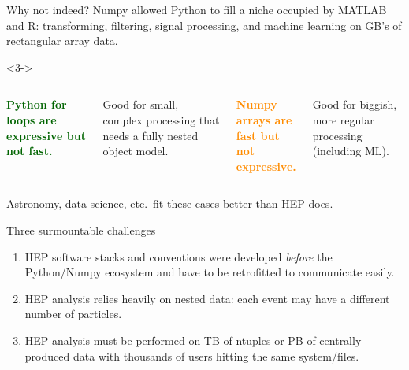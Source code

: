 \documentclass[aspectratio=169]{beamer}
\begin{document}
\begin{frame}{Why not indeed?}
\vspace{0.5 cm}
Numpy allowed Python to fill a niche occupied by MATLAB and R: transforming, filtering, signal processing, and machine learning on GB's of rectangular array data.

\vspace{0.5 cm}

\vspace{0.75 cm}
\begin{uncoverenv}<3->
\begin{columns}[t]

\textcolor{darkgreen}{\bf Python for loops are expressive but not fast.}

\vspace{0.25 cm}
Good for small, complex processing that needs a fully nested object model.

\textcolor{darkorange}{\bf Numpy arrays are \\ fast but not expressive.}

\vspace{0.25 cm}
Good for biggish, more regular processing (including ML).

\end{columns}

\vspace{0.75 cm}
Astronomy, data science, etc.\ fit these cases better than HEP does.
\end{uncoverenv}
\end{frame}

\begin{frame}{Three surmountable challenges}
\large
\vspace{0.5 cm}
\begin{center}
\begin{minipage}{0.75\linewidth}
\begin{enumerate}\setlength{\itemsep}{1 cm}
\item HEP software stacks and conventions were developed {\it before} the Python/Numpy ecosystem and have to be retrofitted to communicate easily.

\item HEP analysis relies heavily on nested data: each event may have a different number of particles.

\item HEP analysis must be performed on TB of ntuples or PB of centrally produced data with thousands of users hitting the same system/files.
\end{enumerate}
\end{minipage}\mbox{\hspace{1 cm}}
\end{center}
\end{frame}
\end{document}
